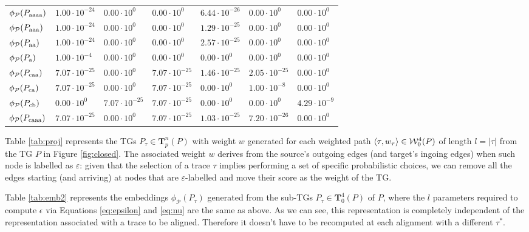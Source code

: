 \begin{table}[!t]
\begin{tabular}{l|l|l|l|l|l|l|}
		
		$\phi_{\mathcal{P}}(P_\textup{aaaa})$ & $1.00\cdot 10^{-24}$ & $0.00\cdot 10^{0}$ & $0.00\cdot 10^{0}$& $6.44\cdot 10^{-26}$& $0.00\cdot 10^{0}$& $0.00\cdot 10^{0}$\\
		$\phi_{\mathcal{P}}(P_\textup{aaa})$ & $1.00\cdot 10^{-24}$ & $0.00\cdot 10^{0}$ & $0.00\cdot 10^{0}$& $1.29\cdot 10^{-25}$& $0.00\cdot 10^{0}$& $0.00\cdot 10^{0}$\\
		$\phi_{\mathcal{P}}(P_\textup{aa})$ & $1.00\cdot 10^{-24}$ & $0.00\cdot 10^{0}$ & $0.00\cdot 10^{0}$& $2.57\cdot 10^{-25}$& $0.00\cdot 10^{0}$& $0.00\cdot 10^{0}$\\
		$\phi_{\mathcal{P}}(P_\textup{a})$ & $1.00\cdot 10^{-4}$ & $0.00\cdot 10^{0}$ & $0.00\cdot 10^{0}$& $0.00\cdot 10^{0}$& $0.00\cdot 10^{0}$& $0.00\cdot 10^{0}$\\
		$\phi_{\mathcal{P}}(P_\textup{caa})$ & $7.07\cdot 10^{-25}$ & $0.00\cdot 10^{0}$ & $7.07\cdot 10^{-25}$& $1.46\cdot 10^{-25}$& $2.05\cdot 10^{-25}$& $0.00\cdot 10^{0}$\\
		$\phi_{\mathcal{P}}(P_\textup{ca})$ & $7.07\cdot 10^{-25}$ & $0.00\cdot 10^{0}$ & $7.07\cdot 10^{-25}$& $0.00\cdot 10^{0}$& $1.00\cdot 10^{-8}$& $0.00\cdot 10^{0}$\\
		$\phi_{\mathcal{P}}(P_\textup{cb})$ &  $0.00\cdot 10^{0}$ & $7.07\cdot 10^{-25}$ & $7.07\cdot 10^{-25}$& $0.00\cdot 10^{0}$&  $0.00\cdot 10^{0}$ & $4.29\cdot 10^{-9}$\\
		$\phi_{\mathcal{P}}(P_\textup{caaa})$  & $7.07\cdot 10^{-25}$ &  $0.00\cdot 10^{0}$ & $7.07\cdot 10^{-25}$& $1.03\cdot 10^{-25}$&  $7.20\cdot 10^{-26}$ & $0.00\cdot 10^{0}$\\
		\bottomrule
	\end{tabular}
\end{table}
\begin{example}\label{ex:explainembed}
	Table \ref{tab:proj} represents the TGs $P_\tau\in\mathbf{T}_p^n(P)$ with weight $w$ generated for each weighted path $\braket{\tau,w_\tau}\in \mathcal{W}_0^4(P)$ of length $l=|\tau|$ from the TG $P$ in Figure \ref{fig:closed}. The associated weight $w$ derives from the source's outgoing edges (and target's ingoing edges) when such node is labelled as $\varepsilon$: given that the selection of a trace $\tau$ implies performing a set of specific probabilistic choices, we can remove all the edges starting (and arriving) at nodes that are $\varepsilon$-labelled and move their score as the weight of the TG.
	
	Table \ref{tab:emb2} represents the embeddings $\phi_{\mathcal{P}}(P_\tau)$ generated from the sub-TGs $P_\tau\in \mathbf{T}_0^4(P)$ of $P$, where the $l$ parameters required to compute $\epsilon$ via Equations \ref{eq:epsilon} and \ref{eq:nu} are the same as above. As we can see, this representation is completely independent of the representation associated with a trace to be aligned. Therefore it doesn't have to be recomputed at each alignment with a different $\tau^*$.
\end{example}




